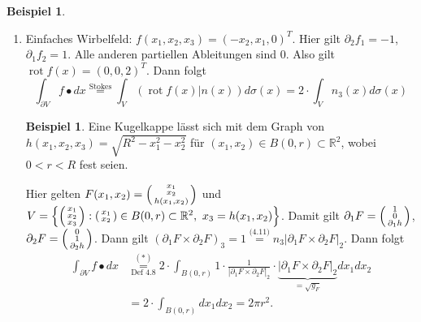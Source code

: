 \documentclass[a4paper]{scrreprt}
\newcommand{\R}{\mathbb{R}}
\newcommand{\overunderset}[3]{\overset{#1}{\underset{#3}{#2}}}
\newenvironment{jsmallmatrix}{\left( \begin{smallmatrix}}{\end{smallmatrix} \right)}
\newcommand{\jlabel}[1]{\label{j_#1}}
\newcommand{\jshortlink}[1]{\jhyperref{#1}{\text{#1}}}
\newcommand{\jhyperref}[2]{\hyperref[j_#1]{#2}}
\newcommand{\rot}{\mathop{\mathrm{{rot}}}}
\theoremstyle{plain}
\theoremstyle{definition}
\newtheorem{expl}[thm]{Beispiel}
\newtheorem*{expl*}{Beispiel}
\begin{document}
{{{{\begin{expl}
\begin{enumerate}
        \item 
            \jlabel{Bsp 4.23b)}
            Einfaches Wirbelfeld: $f(x_1, x_2, x_3) = (-x_2,x_1,0)^T$. Hier gilt $\partial_2 f_1 = -1$, $\partial_1 f_2 = 1$. Alle anderen partiellen Ableitungen sind $0$. Also gilt $\rot f(x) = (0,0,2)^T$. Dann folgt
            \[
                \tag{$*$}
                \int_{\partial V} f\bullet dx \overset{\jshortlink{Stokes}}{=} \int_V (\rot f(x)| n(x))d\sigma(x) = 2\cdot \int_V n_3(x) d\sigma(x)
            \]
            \begin{expl*}
                Eine Kugelkappe lässt sich mit dem Graph von $h(x_1,x_2,x_3) = \sqrt{R^2-x_1^2-x_2^2}$ für $(x_1,x_2)\in B(0,r) \subset \R^2$, wobei $0 < r < R$ fest seien.
            \end{expl*}
            Hier gelten $F(x_1,x_2) = \begin{jsmallmatrix}x_1\\ x_2 \\ h(x_1,x_2)\end{jsmallmatrix}$ und\\
            $V = \left\{\begin{jsmallmatrix}x_1\\x_2\\x_3\end{jsmallmatrix} : \begin{jsmallmatrix}x_1\\x_2\end{jsmallmatrix} \in B(0,r) \subset \R^2, \ x_3 = h(x_1,x_2) \right\}$. Damit gilt $\partial_1 F = \begin{jsmallmatrix}1\\0\\ \partial_1 h\end{jsmallmatrix}$, $\partial_2 F = \begin{jsmallmatrix}0\\1\\ \partial_2 h\end{jsmallmatrix}$. Dann gilt $(\partial_1 F \times \partial_2 F)_3 = 1 \overset{\jshortlink{(4.11)}}{=} n_3 |\partial_1 F \times \partial_2 F|_2$. Dann folgt
            \[
                \begin{split}
                    \int_{\partial V} f \bullet dx &\overunderset{(*)}{=}{\jshortlink{Def 4.8}} 2\cdot \int_{B(0,r)} 1\cdot \frac{1}{|\partial_1 F \times \partial_2 F|_2} \cdot \underbrace{|\partial_1 F \times \partial_2 F|_2}_{=\sqrt{g_F}} dx_1 dx_2\\
                    &= 2\cdot \int_{B(0,r)} dx_1 dx_2 = 2\pi r^2.
                \end{split}
            \]
    \end{enumerate}
\end{expl}
}}}}
\end{document}
